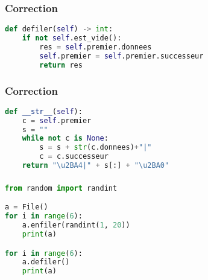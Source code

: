 \documentclass[svgnames,11pt]{beamer}
\begin{document}
\begin{frame}[fragile]
    \frametitle{Correction}

\begin{lstlisting}[language=Python , basicstyle=\ttfamily\small, xleftmargin=1em, xrightmargin=1em]
def defiler(self) -> int:
    if not self.est_vide():
        res = self.premier.donnees
        self.premier = self.premier.successeur
        return res
\end{lstlisting}

\end{frame}
\begin{frame}[fragile]
    \frametitle{Correction}

\begin{lstlisting}[language=Python , basicstyle=\ttfamily\small, xleftmargin=2em, xrightmargin=2em]
def __str__(self):
    c = self.premier
    s = ""
    while not c is None:
        s = s + str(c.donnees)+"|"
        c = c.successeur
    return "\u2BA4|" + s[:] + "\u2BA0"
\end{lstlisting}

\end{frame}
\begin{frame}[fragile]
    \frametitle{}
    \begin{center}
\begin{lstlisting}[language=Python , basicstyle=\ttfamily\small, xleftmargin=2em, xrightmargin=2em]
from random import randint

a = File()
for i in range(6):
    a.enfiler(randint(1, 20))
    print(a)

for i in range(6):
    a.defiler()
    print(a)
\end{lstlisting} 
    \label{CODE}
    \end{center}  

\end{frame}
\end{document}
